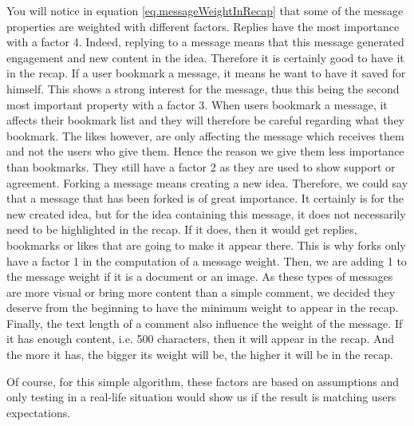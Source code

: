 \documentclass[a4paper,12pt, oneside]{article}
\begin{document}
You will notice in equation \ref{eq.messageWeightInRecap} that some of the message properties are weighted with different factors.
Replies have the most importance with a factor 4.
Indeed, replying to a message means that this message generated engagement and new content in the idea.
Therefore it is certainly good to have it in the recap.
If a user bookmark a message, it means he want to have it saved for himself.
This shows a strong interest for the message, thus this being the second most important property with a factor 3.
When users bookmark a message, it affects their bookmark list and they will therefore be careful regarding what they bookmark.
The likes however, are only affecting the message which receives them and not the users who give them.
Hence the reason we give them less importance than bookmarks.
They still have a factor 2 as they are used to show support or agreement.
Forking a message means creating a new idea.
Therefore, we could say that a message that has been forked is of great importance.
It certainly is for the new created idea, but for the idea containing this message, it does not necessarily need to be highlighted in the recap.
If it does, then it would get replies, bookmarks or likes that are going to make it appear there.
This is why forks only have a factor 1 in the computation of a message weight.
Then, we are adding 1 to the message weight if it is a document or an image.
As these types of messages are more visual or bring more content than a simple comment, we decided they deserve from the beginning to have the minimum weight to appear in the recap.
Finally, the text length of a comment also influence the weight of the message.
If it has enough content, i.e. 500 characters, then it will appear in the recap.
And the more it has, the bigger its weight will be, the higher it will be in the recap.

Of course, for this simple algorithm, these factors are based on assumptions and only testing in a real-life situation would show us if the result is matching users expectations.

\end{document}
